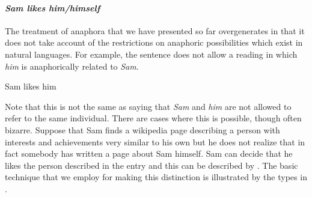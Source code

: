\paragraph{\textit{Sam likes him/himself}}
The treatment of anaphora that we have presented so far overgenerates
in that it does not take account of the restrictions on anaphoric
possibilities which exist in natural languages.  For example, the
sentence \nexteg{} does not allow a reading in which
\textit{him} is anaphorically related to \textit{Sam}.
\begin{ex} 
Sam likes him 
\end{ex} 
Note that this is not the same as saying that \textit{Sam} and
\textit{him} are not allowed to refer to the same individual.  There
are cases where this is possible, though often bizarre.  Suppose that
Sam finds a wikipedia page describing a person with interests and
achievements very similar to his own but he does not realize that in
fact somebody has written a page about Sam himself.  Sam can decide
that he likes the person described in the entry and this can be
described by \preveg{}.  %
The basic technique that we employ for making this distinction is
illustrated by the types in \nexteg{}.
\begin{ex} 
  \begin{subex} 
 
\item {} 
 
\item {}
  
\item {} 
 
\end{subex} 
  
  
\end{ex} 
